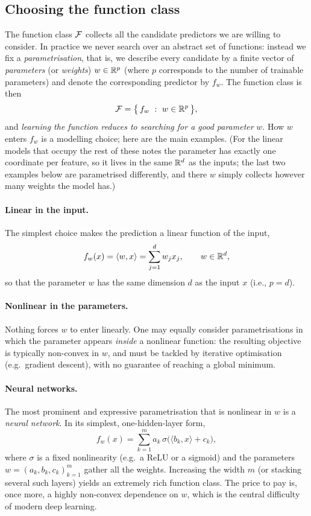 \subsection{Choosing the function class}
\label{subsec:function-class}

The function class $\mathcal{F}$ collects all the candidate predictors we are willing to
consider. In practice we never search over an abstract set of functions:
instead we fix a \emph{parametrisation}, that is, we describe every candidate by
a finite vector of \emph{parameters} (or \emph{weights}) $w \in\mathbb{R}^p$ (where $p$ corresponds to the number of trainable parameters) and denote
the corresponding predictor by $f_w$. The function class is then
\[
\mathcal{F} = \big\{\, f_w \ : \ w \in \mathbb{R}^p \,\big\},
\]
and \emph{learning the function reduces to searching for a good parameter}
$w$.  How $w$ enters $f_w$ is a modelling choice; here are the main examples. (For
the linear models that occupy the rest of these notes the parameter has exactly one
coordinate per feature, so it lives in the same $\mathbb{R}^d$ as the inputs; the last two
examples below are parametrised differently, and there $w$ simply collects however
many weights the model has.)

\paragraph{Linear in the input.}
The simplest choice makes the prediction a linear function of the input,
\[
f_w(x) = \langle w, x \rangle = \sum_{j=1}^d w_j x_j , \qquad w \in \mathbb{R}^d ,
\]
so that the parameter $w$ has the same dimension $d$ as the input $x$ (i.e., $p = d$).


\paragraph{Nonlinear in the parameters.}
Nothing forces $w$ to enter linearly. One may equally consider parametrisations
in which the parameter appears \emph{inside} a nonlinear function: the resulting objective is typically non-convex in $w$, and must be tackled by
iterative optimisation (e.g.\ gradient descent), with no guarantee of reaching a
global minimum.

\paragraph{Neural networks.}
The most prominent and expressive parametrisation that is nonlinear in $w$ is a
\emph{neural network}. In its simplest, one-hidden-layer form,
\[
f_w(x) = \sum_{k=1}^m a_k \, \sigma\big( \langle b_k, x\rangle + c_k \big),
\]
where $\sigma$ is a fixed nonlinearity (e.g.\ a ReLU or a sigmoid) and the
parameters $w = (a_k, b_k, c_k)_{k=1}^m$ gather all the weights. Increasing the
width $m$ (or stacking several such layers) yields an extremely rich
function class. The price to pay is, once more, a highly non-convex dependence
on $w$, which is the central difficulty of modern deep learning.


